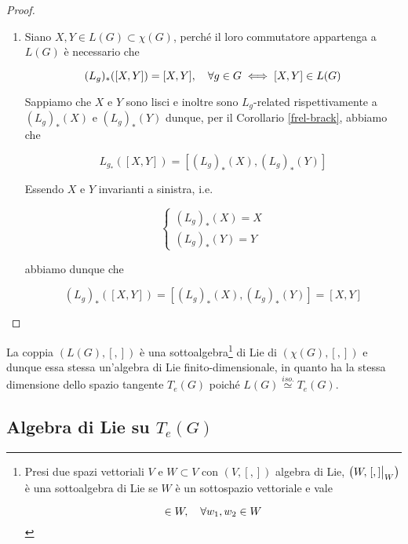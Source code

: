 \begin{proof}
\begin{enumerate}
		\item Siano $ X,Y \in L(G) \subset \chi(G) $, perché il loro commutatore appartenga a $ L(G) $ è necessario che
		
		\begin{equation}
			(L_{g})_{*}([X,Y]) = [X,Y] \qcomma \forall g \in G \iff [X,Y] \in L(G)
		\end{equation}
	
		Sappiamo che $ X $ e $ Y $ sono lisci e inoltre sono $ L_{g} $-related rispettivamente a $ (L_{g})_{*}(X) $ e $ (L_{g})_{*}(Y) $ dunque, per il Corollario \ref{frel-brack}, abbiamo che
		
		\begin{equation}
			L_{g_{*}}([X,Y]) = [(L_{g})_{*}(X), (L_{g})_{*}(Y)]
		\end{equation}
	
		Essendo $ X $ e $ Y $ invarianti a sinistra, i.e.
		
		\begin{equation}
			\begin{cases}
				(L_{g})_{*}(X) = X \\
				(L_{g})_{*}(Y) = Y
			\end{cases}
		\end{equation}
		
		abbiamo dunque che
		
		\begin{equation}
			(L_{g})_{*}([X,Y]) = [(L_{g})_{*}(X), (L_{g})_{*}(Y)] = [X,Y]
		\end{equation}		
	\end{enumerate}
\end{proof}

\begin{corollary}
	La coppia $ (L(G),[,]) $ è una sottoalgebra\footnote{%
		Presi due spazi vettoriali $ V $ e $ W \subset V $ con $ (V,[,]) $ algebra di Lie, $ \left( W, \eval{[,]}_{W} \right) $ è una sottoalgebra di Lie se $ W $ è un sottospazio vettoriale e vale
		
		\begin{equation*}
			[w_{1}, w_{2}] \in W \qcomma \forall w_{1},w_{2} \in W
		\end{equation*}%
	} di Lie di $ (\chi(G),[,]) $ e dunque essa stessa un'algebra di Lie finito-dimensionale, in quanto ha la stessa dimensione dello spazio tangente $ T_{e}(G) $ poiché $ L(G) \stackrel{iso.}{\simeq} T_{e}(G) $.
\end{corollary}

\subsection{Algebra di Lie su $ T_{e}(G) $}

